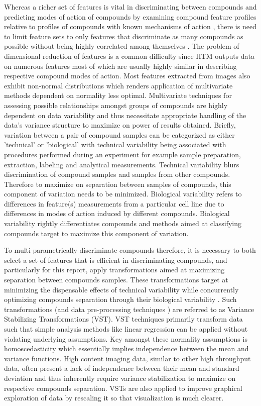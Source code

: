 \documentclass[11pt]{article}
\begin{document}
\par{Whereas a richer set of features is vital in discriminating between compounds and predicting modes of action of compounds by examining compound feature profiles relative to profiles of compounds with known mechanisms of action \cite{Reisen2015}, there is need to limit feature sets to only features that discriminate as many compounds as possible without being highly correlated among themselves \cite{DeJay2013, Ding2005}. The problem of dimensional reduction of features is a common difficulty since HTM outputs data on numerous features most of which are usually highly similar in describing respective compound modes of action. Most features extracted from images also exhibit non-normal distributions which renders application of multivariate methods dependent on normality less optimal. Multivariate techniques for assessing possible relationships amongst groups of compounds are highly dependent on data variability \cite{Jagdish1982, wichern2007, Parsons2007} and thus necessitate appropriate handling of the data's variance structure to maximize on power of results obtained. Briefly, variation between a pair of compound samples can be categorized as either 'technical' or 'biological' \cite{Churchill2002,VandenBerg2006,Parsons2007} with technical variability being associated with procedures performed during an experiment for example sample preparation, extraction, labeling and analytical measurements. Technical variability blurs discrimination of compound samples and samples from other compounds. Therefore to maximize on separation between samples of compounds, this component of variation needs to be minimized. Biological variability refers to differences in feature(s) measurements from a particular cell line due to differences in modes of action induced by different compounds. Biological variability rightly differentiates compounds and methods aimed at classifying compounds target to maximize this component of variation.} 
\par{To multi-parametrically discriminate compounds therefore, it is necessary to both select a set of features that is efficient in discriminating compounds, and particularly for this report, apply transformations aimed at maximizing separation between compounds samples. These transformations target at minimizing the dispensable effects of technical variability while concurrently optimizing compounds separation through their biological variability \cite{Churchill2002,VandenBerg2006,Parsons2007,Purohit2004}. Such transformations (and data pre-processing techniques ) are referred to as Variance Stabilizing Transformations (VST). VST techniques primarily transform data such that simple analysis methods like linear regression can be applied without violating underlying assumptions. Key amongst these normality assumptions is homoscedasticity which essentially implies independence between the mean and variance functions. High content imaging data, similar to other high throughput data, often present a lack of independence between their mean and standard deviation \cite{haney2014rapid} and thus inherently require variance stabilization to maximize on respective compounds separation. VSTs are also applied to improve graphical exploration of data by rescaling it so that visualization is much clearer.}
\end{document}
